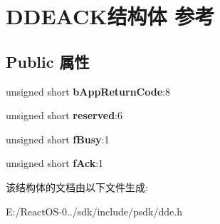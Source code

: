 \hypertarget{struct_d_d_e_a_c_k}{}\section{D\+D\+E\+A\+C\+K结构体 参考}
\label{struct_d_d_e_a_c_k}
\subsection*{Public 属性}
\begin{DoxyCompactItemize}
\item 
\mbox{\label{struct_d_d_e_a_c_k_a4d1cba70808af776dec7f52dfc57bb3b}} 
unsigned short {\bfseries b\+App\+Return\+Code}\+:8
\item 
\mbox{\label{struct_d_d_e_a_c_k_a3957d15a63896df40d74e4bcbc1788d8}} 
unsigned short {\bfseries reserved}\+:6
\item 
\mbox{\label{struct_d_d_e_a_c_k_a08823f08a7548b0c6ac9b8714e15d3de}} 
unsigned short {\bfseries f\+Busy}\+:1
\item 
\mbox{\label{struct_d_d_e_a_c_k_a0eb7514152c9389c4750d399110ca211}} 
unsigned short {\bfseries f\+Ack}\+:1
\end{DoxyCompactItemize}


该结构体的文档由以下文件生成\+:\begin{DoxyCompactItemize}
\item 
E\+:/\+React\+O\+S-\/0../sdk/include/psdk/dde.\+h\end{DoxyCompactItemize}
